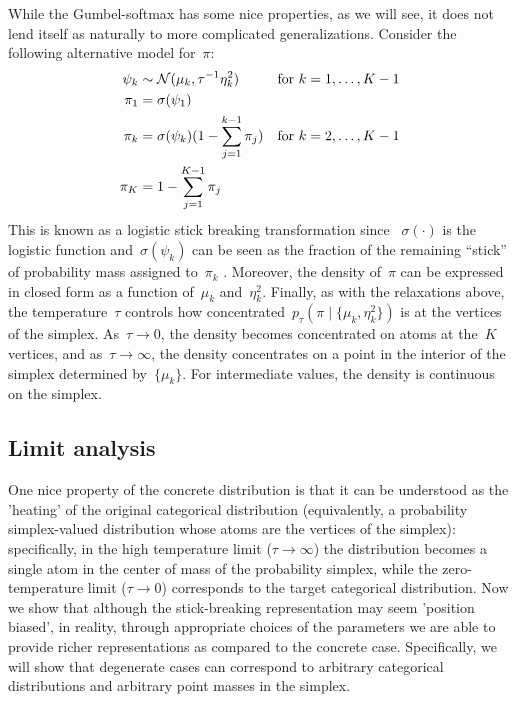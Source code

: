 \documentclass{article}
\begin{document}
While the Gumbel-softmax has some nice properties, as we will see, it does
not lend itself as naturally to more complicated generalizations. 
Consider the following alternative model for~${\pi}$:
\begin{align}
  \psi_k &\sim \mathcal{N}(\mu_k, \tau^{-1} \eta_k^2) & &  \text{for } k=1, \ldots, K-1\\
  {\pi}_1 &= \sigma(\psi_1) \\
  {\pi}_k &= \sigma(\psi_k) (1- \sum_{j=1}^{k-1} {\pi}_j) & &  \text{for } k=2, \ldots, K-1\\
{\pi}_K &= 1- \sum_{j=1}^{K-1} {\pi}_j
\end{align}
This is known as a logistic stick breaking transformation since
~$\sigma(\cdot)$ is the logistic function and~$\sigma(\psi_k)$ can be
seen as the fraction of the remaining ``stick'' of probability mass
assigned to~${\pi}_k$ \citep{linderman2015dependent}. Moreover,
the density of~${\pi}$ can be expressed in closed form as a
function of~$\mu_k$ and~$\eta_k^2$.  Finally, as with the relaxations
above, the temperature~$\tau$ controls how
concentrated~$p_\tau({\pi} \mid \{\mu_k, \eta_k^2\})$ is at the
vertices of the simplex. As~$\tau \to 0$, the density becomes
concentrated on atoms at the~$K$ vertices, and as~$\tau \to \infty$,
the density concentrates on a point in the interior of the simplex
determined by~$\{\mu_k\}$. For intermediate values, the density is
continuous on the simplex.

\subsection{Limit analysis}
One nice property of the concrete distribution \citep{maddison2016concrete, jang2016categorical} is that it can be understood as the 'heating' of the original categorical distribution (equivalently, a probability simplex-valued distribution whose atoms are the vertices of the simplex): specifically, in the high temperature limit ($\tau \rightarrow \infty$) the distribution becomes a single atom in the center of mass of the probability simplex, while the zero-temperature limit ($\tau\rightarrow 0$) corresponds to the target categorical distribution. Now we show that although the stick-breaking representation may seem 'position biased', in reality, through appropriate choices of the parameters we are able to provide richer representations as compared to the concrete case. Specifically, we will show that degenerate cases can correspond to arbitrary categorical distributions and arbitrary point masses in the simplex.
\end{document}
